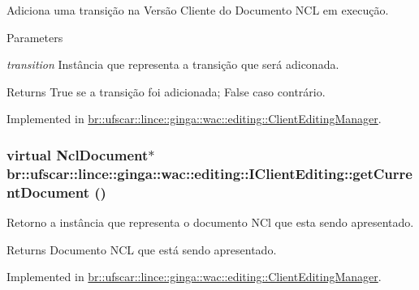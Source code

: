 Adiciona uma transição na Versão Cliente do Documento NCL em execução. 


\begin{DoxyParams}{Parameters}
\item[{\em transition}]Instância que representa a transição que será adiconada. \end{DoxyParams}
\begin{DoxyReturn}{Returns}
True se a transição foi adicionada; False caso contrário. 
\end{DoxyReturn}


Implemented in \hyperlink{classbr_1_1ufscar_1_1lince_1_1ginga_1_1wac_1_1editing_1_1ClientEditingManager_af872bea61e20e96b7ef968e24627d8c7}{br::ufscar::lince::ginga::wac::editing::ClientEditingManager}.

\hypertarget{classbr_1_1ufscar_1_1lince_1_1ginga_1_1wac_1_1editing_1_1IClientEditing_a72ba6d8611de7d1b8569a5b5d68e4fb9}{
\subsubsection[{getCurrentDocument}]{\setlength{\rightskip}{0pt plus 5cm}virtual NclDocument$\ast$ br::ufscar::lince::ginga::wac::editing::IClientEditing::getCurrentDocument ()}}
\label{classbr_1_1ufscar_1_1lince_1_1ginga_1_1wac_1_1editing_1_1IClientEditing_a72ba6d8611de7d1b8569a5b5d68e4fb9}


Retorno a instância que representa o documento NCl que esta sendo apresentado. 

\begin{DoxyReturn}{Returns}
Documento NCL que está sendo apresentado. 
\end{DoxyReturn}


Implemented in \hyperlink{classbr_1_1ufscar_1_1lince_1_1ginga_1_1wac_1_1editing_1_1ClientEditingManager_a49b1b969381d54583a4c0ae61756ba7b}{br::ufscar::lince::ginga::wac::editing::ClientEditingManager}.

